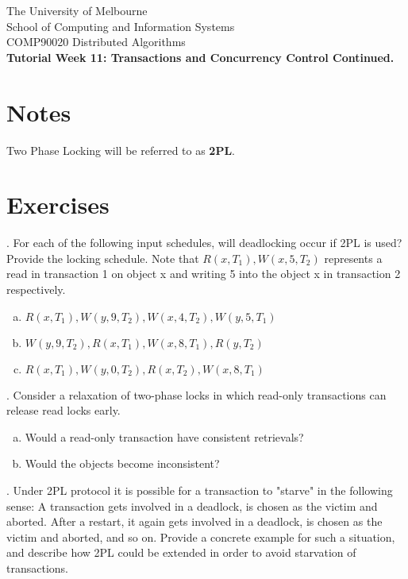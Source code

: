 \documentclass[12pt]{article}
\newcounter{question}
\newcommand{\question}[1]{
    \stepcounter{question}
    \thequestion. #1 \hfill
}
\begin{document}
\begin{center}
    {\sc The University of Melbourne
        \\
        School of Computing and Information Systems
        \\
    COMP90020 Distributed Algorithms}
    \bigskip \\
    {\Large\bf Tutorial Week 11: Transactions and Concurrency Control Continued.}
    \bigskip \\
\end{center}

\section*{Notes}

Two Phase Locking will be referred to as \textbf{2PL}.
\section*{Exercises}

\setcounter{question}{45}

\question{For each of the following input schedules, will deadlocking occur if 2PL is used? Provide the locking schedule. Note that $R(x,T_1), W(x,5,T_2)$ represents a read in transaction 1 on object x and writing 5 into the object x in transaction 2 respectively.}

\begin{enumerate}[(a)]
    \item $R(x,T_1), W(y,9,T_2), W(x,4,T_2), W(y, 5, T_1)$
    \item $W(y,9,T_2), R(x,T_1), W(x,8, T_1), R(y,T_2)$
    \item $R(x,T_1),W(y,0,T_2), R(x,T_2), W(x,8, T_1)$
\end{enumerate}


\question{Consider a relaxation of two-phase locks in which read-only transactions can release read locks early.}

\begin{enumerate}[(a)]
    \item Would a read-only transaction have consistent retrievals?
    \item Would the objects become inconsistent?
\end{enumerate}

\question{Under 2PL protocol it is possible for a transaction to "starve" in the following sense: A transaction gets involved in a deadlock, is chosen as the victim and aborted. After a restart, it again gets involved in a deadlock, is chosen as the victim and aborted, and so on. Provide a concrete example for such a situation, and describe how 2PL could be extended in order to avoid starvation of transactions.}
\end{document}
